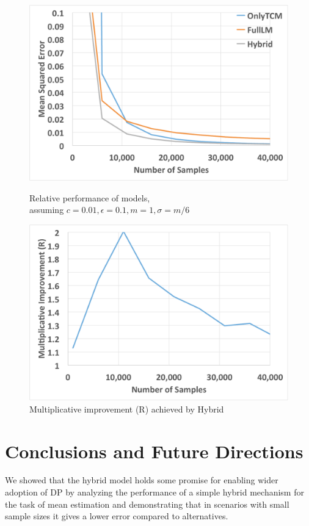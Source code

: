 \documentclass{article}
\theoremstyle{plain}
\begin{document}
\begin{figure}[t]
\begin{minipage}[t]{.49\textwidth}
\includegraphics[width=0.99\linewidth]{eps01c01.pdf}
\caption{Relative performance of models,\\ assuming $c=0.01, \epsilon=0.1, m=1, \sigma = m/6$}
\label{fig:1}
\end{minipage}
\begin{minipage}[t]{.49\textwidth}
\includegraphics[width=0.99\linewidth]{imp_eps01c01.pdf}
\caption{Multiplicative improvement (R) achieved by Hybrid}
\label{fig:2}
\end{minipage}
\end{figure}

\section{Conclusions and Future Directions}
We showed that the hybrid model holds some promise for enabling wider adoption of DP by analyzing the performance of a simple hybrid mechanism for the task of mean estimation and demonstrating that in scenarios with small sample sizes it gives a lower error compared to alternatives.
\end{document}
